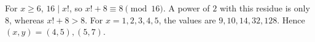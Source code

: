 For $x\ge6$, $16\mid x!$, so $x!+8\equiv8\pmod{16}$. A power of $2$ with this residue is only $8$, whereas $x!+8>8$. For $x=1,2,3,4,5$, the values are $9,10,14,32,128$. Hence $\boxed{(x,y)=(4,5),(5,7)}$.
